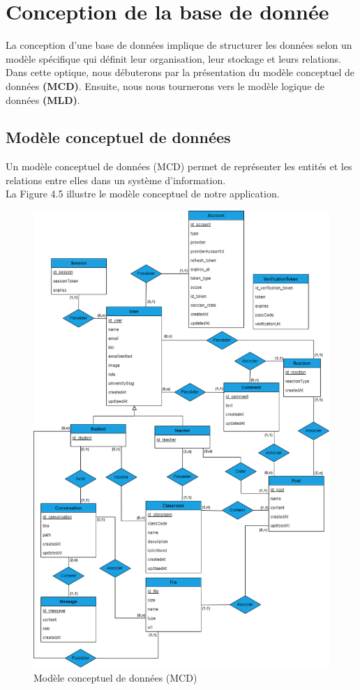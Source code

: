 \section{Conception de la base de donnée}
\justifying
La conception d'une base de données implique de structurer les données selon un modèle spécifique qui définit leur organisation, leur stockage et leurs relations. Dans cette optique, nous débuterons par la présentation du modèle conceptuel de données \textbf{(MCD)}. Ensuite, nous nous tournerons vers le modèle logique de données \textbf{(MLD)}.

\subsection{Modèle conceptuel de données}
Un modèle conceptuel de données (MCD) permet de représenter les entités et les relations entre elles dans un système d’information.\\
La Figure 4.5 illustre le modèle conceptuel de notre application.
\begin{figure}[H]
    \centering
    \includegraphics[width=1.1\textwidth,height=1.2\textwidth]{images/chp4/fig5.png}
    \caption{Modèle conceptuel de données (MCD)}
    \label{fig:Modèle conceptuel de données (MCD)}    
\end{figure}


